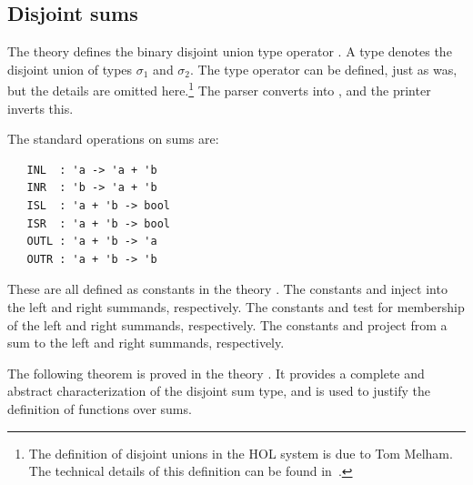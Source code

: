 \subsection{Disjoint sums}
\label{sum}


The theory  defines the binary disjoint union type
operator .  A type 
denotes the disjoint union of types $\sigma_1$ and $\sigma_2$.  The
type operator  can be defined, just as  was,
but the details are omitted here.\footnote{The definition of disjoint
  unions in the HOL system is due to Tom Melham. The technical details
  of this definition can be found in~\cite{Melham-banff}.}  The \HOL{}
parser
%
%
converts 
%
%
into , and the printer inverts
this.

The standard operations on sums are:

\begin{hol}
\begin{verbatim}
   INL  : 'a -> 'a + 'b
   INR  : 'b -> 'a + 'b
   ISL  : 'a + 'b -> bool
   ISR  : 'a + 'b -> bool
   OUTL : 'a + 'b -> 'a
   OUTR : 'a + 'b -> 'b
\end{verbatim}
\end{hol}

\noindent These are all defined as constants in the theory .  The
constants  and  inject into the left and right summands,
respectively. The constants  and  test for membership of the
left and right summands, respectively. The constants  and 
project from a sum to the left and right summands, respectively.

The following theorem is proved in the theory . It provides a
complete and abstract characterization of the disjoint sum type, and
is used to justify the definition of functions over sums.

